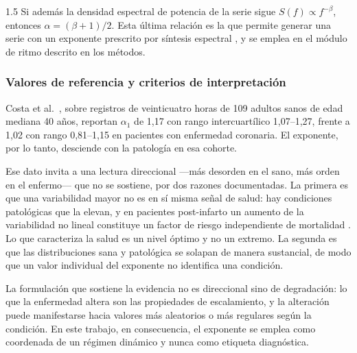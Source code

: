 \begin{spacing}{1.5}
Si además la densidad espectral de potencia de la serie sigue
$S(f) \propto f^{-\beta}$, entonces $\alpha = (\beta+1)/2$. Esta última relación
es la que permite generar una serie con un exponente prescrito por síntesis
espectral \cite{hardstone2012dfa}, y se emplea en el módulo de ritmo descrito
en los métodos.

\subsubsection{Valores de referencia y criterios de interpretación}

Costa et al.\ \cite{costa2017fragmentation}, sobre registros de veinticuatro
horas de 109 adultos sanos de edad mediana 40 años, reportan $\alpha_1$ de
1,17 con rango intercuartílico 1,07--1,27, frente a 1,02 con rango
0,81--1,15 en pacientes con enfermedad coronaria. El exponente, por lo tanto,
desciende con la patología en esa cohorte.

Ese dato invita a una lectura direccional ---más desorden en el sano, más
orden en el enfermo--- que no se sostiene, por dos razones documentadas. La primera es
que una variabilidad mayor no es en sí misma señal de salud: hay condiciones
patológicas que la elevan, y en pacientes post-infarto un aumento de la
variabilidad no lineal constituye un factor de riesgo independiente de
mortalidad \cite{shaffer2017overview}. Lo que caracteriza la salud es un nivel
óptimo y no un extremo. La segunda es que las distribuciones sana y patológica
se solapan de manera sustancial, de modo que un valor individual del exponente
no identifica una condición.

La formulación que sostiene la evidencia no es direccional sino de degradación:
lo que la enfermedad altera son las propiedades de escalamiento, y la
alteración puede manifestarse hacia valores más aleatorios o más regulares
según la condición. En este trabajo, en consecuencia, el exponente se emplea
como coordenada de un régimen dinámico y nunca como etiqueta diagnóstica.

\end{spacing}
